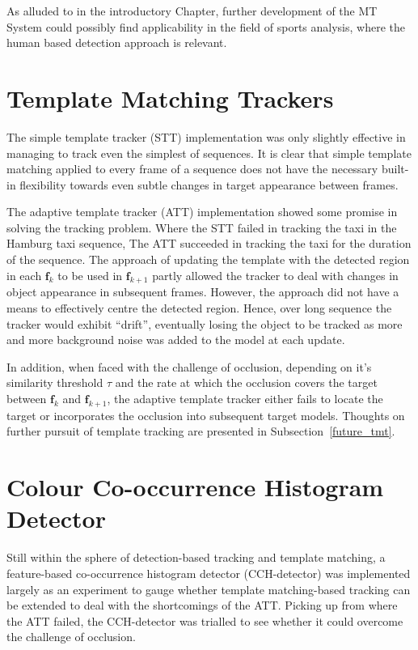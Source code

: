 As alluded to in the introductory Chapter, further development of the MT System
could possibly find applicability in the field of sports analysis, where the
human based detection approach is relevant.

\section{Template Matching Trackers}
The simple template tracker (STT) implementation was only slightly effective in
managing to track even the simplest of sequences. It is clear that simple template
matching applied to every frame of a sequence does not have the necessary built-in
flexibility towards even subtle changes in target appearance between frames.

The adaptive template tracker (ATT) implementation showed some promise in solving the
tracking problem. Where the STT failed in tracking the
taxi in the Hamburg taxi sequence, The ATT succeeded in tracking the taxi for the duration of the sequence. 
The approach of updating the template with the detected region in each
$\mathbf{f}_k$ to be used in $\mathbf{f}_{k+1}$ partly allowed the tracker to
deal with changes in object appearance in subsequent frames. However, the
approach did not have a means to effectively centre the detected region. Hence,
over long sequence the tracker would exhibit ``drift'', eventually losing the
object to be tracked as more and more background noise was added to the model at
each update.

In addition, when faced with the challenge of occlusion, depending on it's
similarity threshold $\tau$ and the rate at which the occlusion covers the
target between $\mathbf{f}_k$ and $\mathbf{f}_{k+1}$, the adaptive template
tracker either fails to locate the target or incorporates the occlusion into
subsequent target models. Thoughts on further pursuit of template tracking are
presented in Subsection~\ref{future_tmt}.

\section{Colour Co-occurrence Histogram Detector}
Still within the sphere of detection-based tracking and template matching, a
feature-based co-occurrence histogram detector (CCH-detector) was implemented largely as an
experiment to gauge whether template matching-based tracking can be extended to
deal with the shortcomings of the ATT\@. 
Picking up from where the ATT failed, the CCH-detector was
trialled to see whether it could overcome the challenge of occlusion.

